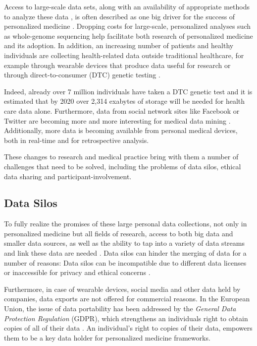\documentclass[a4paper,num-refs]{oup-contemporary}
\begin{document}
Access to large-scale data sets, along with an availability of appropriate methods to analyze these data \cite{Dilsizian2013, Moon2007}, is often described as one big driver for the success of personalized medicine \cite{Kohane2015}. Dropping costs for large-scale, personalized analyses such as whole-genome sequencing \cite{wetterstrand} help facilitate both research of personalized medicine and its adoption. In addition, an increasing number of patients and healthy individuals are collecting health-related data outside traditional healthcare, for example through wearable devices \cite{Swan2009} that produce data useful for research \cite{Gay2015} or through direct-to-consumer (DTC) genetic testing \cite{Corpas2015}.

Indeed, already over 7 million individuals have taken a DTC genetic test \cite{growthancestry} and it is estimated that by 2020 over 2,314 exabytes of storage will be needed for health care data \cite{emc} alone. Furthermore, data from social network sites like Facebook or Twitter are becoming more and more interesting for medical data mining \cite{Rozenblum2013}. Additionally, more data is becoming available from personal medical devices, both in real-time and for retrospective analysis. 

These changes to research and medical practice bring with them a number of challenges that need to be solved, including the problems of data silos, ethical data sharing and participant-involvement.

\subsection{Data Silos}
To fully realize the promises of these large personal data collections, not only in personalized medicine but all fields of research, access to both big data and smaller data sources, as well as the ability to tap into a variety of data streams and link these data are needed \cite{Weber2014, Kohane2015}. Data silos can hinder the merging of data for a number of reasons: Data silos can be incompatible due to different data licenses \cite{Carbon2018} or inaccessible for privacy and ethical concerns \cite{Blasimme2018, Kossmann2014, Tenopir2011}. 

Furthermore, in case of wearable devices, social media and other data held by companies, data exports are not offered for commercial reasons. In the European Union, the issue of data portability has been addressed by the \emph{General Data Protection Regulation} (GDPR), which strengthens an individuals right to obtain copies of all of their data \cite{DeHert2018}. An individual's right to copies of their data, empowers them to be a key data holder for personalized medicine frameworks. 
\end{document}
